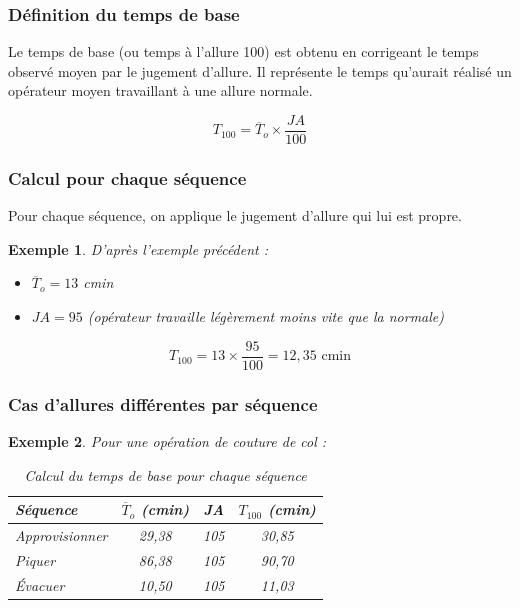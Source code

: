 \documentclass[a4paper,12pt]{article}
\newtheorem{exemple}{Exemple}[section]
\begin{document}
\subsubsection{Définition du temps de base}

Le temps de base (ou temps à l'allure 100) est obtenu en corrigeant le temps observé moyen par le jugement d'allure. Il représente le temps qu'aurait réalisé un opérateur moyen travaillant à une allure normale.

\[
T_{100} = \overline{T}_o \times \frac{JA}{100}
\]

\subsubsection{Calcul pour chaque séquence}

Pour chaque séquence, on applique le jugement d'allure qui lui est propre.

\begin{exemple}
D'après l'exemple précédent :

\begin{itemize}
    \item $\overline{T}_o = 13$ cmin
    \item $JA = 95$ (opérateur travaille légèrement moins vite que la normale)
\end{itemize}

\[
T_{100} = 13 \times \frac{95}{100} = 12,35 \text{ cmin}
\]
\end{exemple}

\subsubsection{Cas d'allures différentes par séquence}

\begin{exemple}
Pour une opération de couture de col :

\begin{table}[ht]
\centering
\begin{tabular}{|l|c|c|c|}
\hline
\textbf{Séquence} & $\overline{T}_o$ (cmin) & \textbf{JA} & $T_{100}$ (cmin) \\
\hline
Approvisionner & 29,38 & 105 & 30,85 \\
Piquer & 86,38 & 105 & 90,70 \\
Évacuer & 10,50 & 105 & 11,03 \\
\hline
\end{tabular}
\caption{Calcul du temps de base pour chaque séquence}
\end{table}
\end{exemple}
\end{document}
